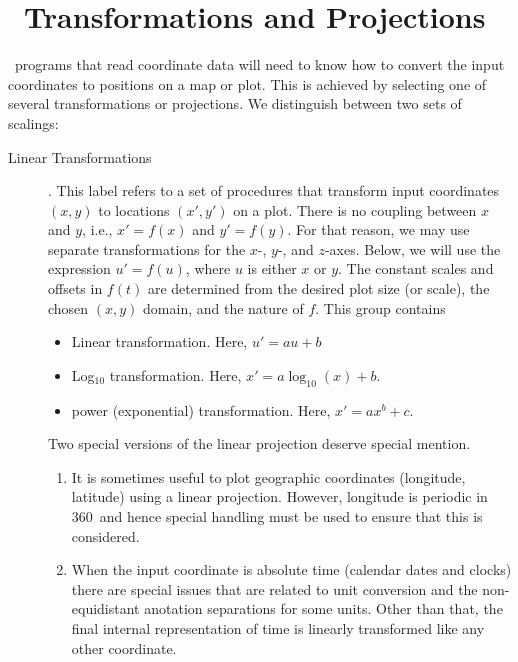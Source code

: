 %
%
\chapter{\gmt\ Transformations and Projections}
\thispagestyle{headings}

\GMT\ programs that read coordinate data will need to know how
to convert the input coordinates to positions on a map or plot.
This is achieved by selecting one of several transformations or projections.
We distinguish between two sets of scalings:

\begin{description}
\item [Linear Transformations].  This label refers to a set of procedures
that transform input coordinates $(x,y)$ to locations $(x', y')$ on a plot.
There is no coupling between $x$ and $y$, i.e., $x' = f(x)$ and $y' = f(y)$.
For that reason, we may use separate transformations for the $x$-, $y$-, and
$z$-axes.
Below, we will use the expression $u' = f(u)$, where $u$ is either $x$ or $y$.
The constant scales and offsets in $f(t)$ are determined from the desired plot
size (or scale), the chosen $(x,y)$ domain, and the nature of $f$.
This group contains

\begin{itemize}
\item Linear transformation.  Here, $u' = au + b$
\item Log$_{10}$ transformation.  Here, $x' = a \log_{10}(x) + b$.
\item power (exponential) transformation.  Here, $x' = a x^b + c$.
\end{itemize}

Two special versions of the linear projection deserve special mention.

\begin{enumerate}
\item It is sometimes useful to plot geographic coordinates (longitude, latitude) using
a linear projection.  However, longitude is periodic in 360\DS\ and hence special handling
must be used to ensure that this is considered.
\item When the input coordinate is absolute time (calendar dates and clocks) there are special
issues that are related to unit conversion and the non-equidistant anotation separations for
some units.  Other than that, the final internal representation of time is linearly transformed
like any other coordinate.
\end{enumerate}


\end{description}
